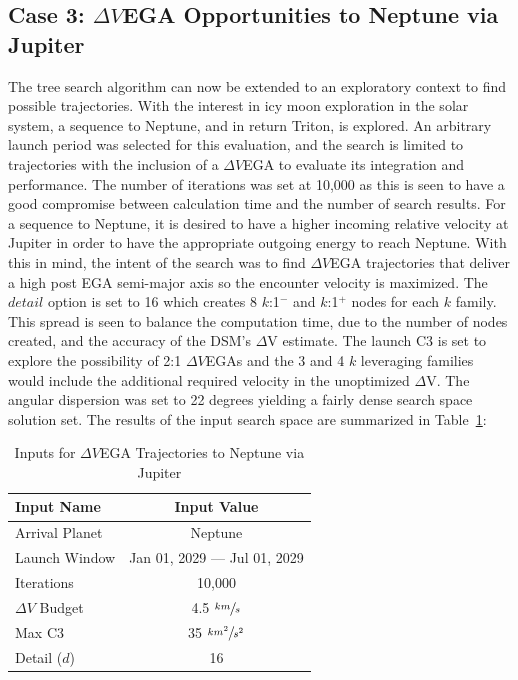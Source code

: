 \documentclass[letterpaper, paper,11pt]{./AAS}		%
\begin{document}
\subsection{Case 3: $\Delta V$EGA Opportunities to Neptune via Jupiter}
The tree search algorithm can now be extended to an exploratory context to find possible trajectories. With the interest in icy moon exploration in the solar system, a sequence to Neptune, and in return Triton, is explored\cite{Hubbard2010}. An arbitrary launch period was selected for this evaluation, and the search is limited to trajectories with the inclusion of a $\Delta V$EGA to evaluate its integration and performance. The number of iterations was set at 10,000 as this is seen to have a good compromise between calculation time and the number of search results. For a sequence to Neptune, it is desired to have a higher incoming relative velocity at Jupiter in order to have the appropriate outgoing energy to reach Neptune. With this in mind, the intent of the search was to find $\Delta V$EGA trajectories that deliver a high post EGA semi-major axis so the encounter velocity is maximized. The $\textit{detail}$ option is set to 16 which creates 8 $k$:1$^{-}$ and $k$:1$^{+}$ nodes for each $k$ family. This spread is seen to balance the computation time, due to the number of nodes created, and the accuracy of the DSM's $\Delta$V estimate. The launch C3 is set to explore the possibility of 2:1 $\Delta V$EGAs and the 3 and 4 $k$ leveraging families  would include the additional required velocity in the unoptimized $\Delta$V. The angular dispersion was set to 22 degrees yielding a fairly dense search space solution set. The results of the input search space are summarized in Table~\ref{tab:tritonInputs}:
%
%
\begin{table}[h]
    \begin{center}
        \caption{Inputs for $\Delta V$EGA Trajectories to Neptune via Jupiter}
        \label{tab:tritonInputs}
        \begin{tabular}{l|c}
					\toprule
            \textbf{Input Name} & \textbf{Input Value}\\
            \hline
            Arrival Planet & Neptune \\
            Launch Window \quad \quad & Jan 01, 2029 --- Jul 01, 2029 \\
            Iterations & 10,000 \\
            $\Delta V$ Budget & 4.5 $\sfrac{km}{s}$ \\
            Max C3 & 35 $\sfrac{km^2}{s^2}$ \\
            Detail ($d$) & 16 \\
						\bottomrule
        \end{tabular}
    \end{center}
\end{table}
\end{document}
